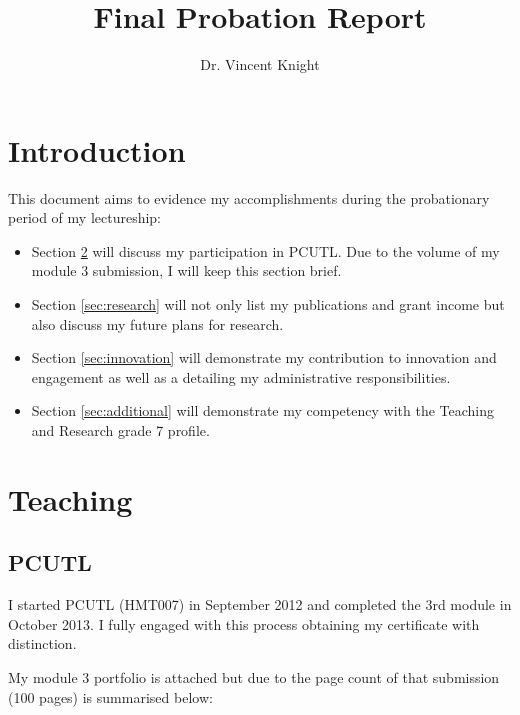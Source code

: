 \documentclass{article}
\title{Final Probation Report}
\author{Dr. Vincent Knight}
\begin{document}
\maketitle

\section{Introduction}\label{sec:introduction}

This document aims to evidence my accomplishments during the probationary period of my lectureship:

\begin{itemize}
    \item Section \ref{sec:teaching} will discuss my participation in PCUTL.
    Due to the volume of my module 3 submission, I will keep this section brief.
    \item Section \ref{sec:research} will not only list my publications and grant income but also discuss my future plans for research.
    \item Section \ref{sec:innovation} will demonstrate my contribution to innovation and engagement as well as a detailing my administrative responsibilities.
    \item Section \ref{sec:additional} will demonstrate my competency with the Teaching and Research grade 7 profile.
\end{itemize}

\section{Teaching}\label{sec:teaching}

\subsection{PCUTL}

I started PCUTL (HMT007) in September 2012 and completed the 3rd module in October 2013. I fully engaged with this process obtaining my certificate with distinction.

My module 3 portfolio is attached but due to the page count of that submission (100 pages) is summarised below:
\end{document}

